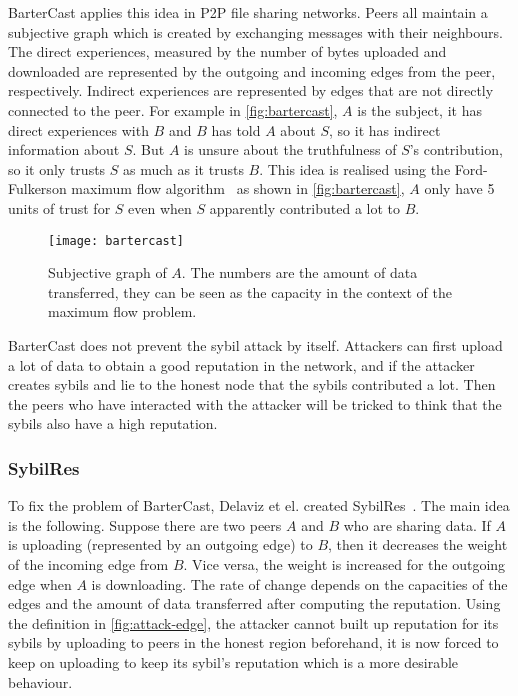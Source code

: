 BarterCast applies this idea in P2P file sharing networks. Peers all maintain a
subjective graph which is created by exchanging messages with their neighbours.
The direct experiences, measured by the number of bytes uploaded and downloaded
are represented by the outgoing and incoming edges from the peer, respectively.
Indirect experiences are represented by edges that are not directly connected to
the peer. For example in \autoref{fig:bartercast}, $A$ is the subject, it has
direct experiences with $B$ and $B$ has told $A$ about $S$, so it has indirect
information about $S$. But $A$ is unsure about the truthfulness of $S$'s
contribution, so it only trusts $S$ as much as it trusts $B$. This idea is
realised using the Ford-Fulkerson maximum flow
algorithm~\cite{thomas2001introduction} as shown in \autoref{fig:bartercast},
$A$ only have 5 units of trust for $S$ even when $S$ apparently contributed a
lot to $B$.

\begin{figure}
  \centering
  \texttt{[image: bartercast]}
  \caption{Subjective graph of $A$. The numbers are the amount of data transferred,
    they can be seen as the capacity in the context of the maximum flow
    problem.}
  \label{fig:bartercast}
\end{figure}

BarterCast does not prevent the sybil attack by itself. Attackers can first
upload a lot of data to obtain a good reputation in the network, and if the
attacker creates sybils and lie to the honest node that the sybils contributed a
lot. Then the peers who have interacted with the attacker will be tricked to
think that the sybils also have a high reputation.

\subsubsection{SybilRes}

To fix the problem of BarterCast, Delaviz et el. created
SybilRes~\cite{delaviz2012sybilres}.
The main idea is the following. Suppose there are two peers $A$ and $B$ who are
sharing data. If $A$ is uploading (represented by an outgoing edge) to $B$, then
it decreases the weight of the incoming edge from $B$. Vice versa, the weight is
increased for the outgoing edge when $A$ is downloading. The rate of change
depends on the capacities of the edges and the amount of data transferred after
computing the reputation. Using the definition in \autoref{fig:attack-edge}, the
attacker cannot built up reputation for its sybils by uploading to peers in the
honest region beforehand, it is now forced to keep on uploading to keep its
sybil's reputation which is a more desirable behaviour.

